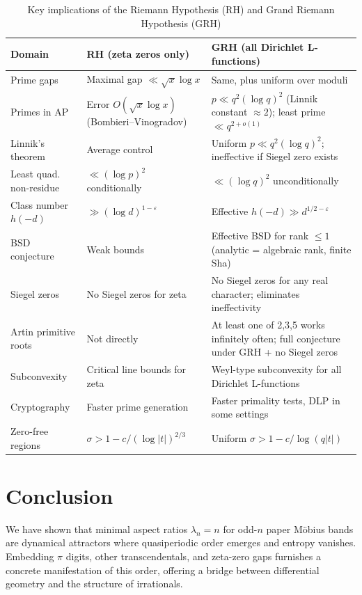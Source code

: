 \documentclass[11pt,a4paper]{article}
\begin{document}
\begin{table}[ht]
\centering
\renewcommand{\arraystretch}{1.3}
\caption{Key implications of the Riemann Hypothesis (RH) and Grand Riemann Hypothesis (GRH)}
\label{tab:rh-grh-implications}
\begin{tabular}{l >{\raggedright\arraybackslash}p{5.8cm} >{\raggedright\arraybackslash}p{5.8cm}}
\toprule
Domain & RH (zeta zeros only) & GRH (all Dirichlet L-functions) \\
\midrule
Prime gaps & Maximal gap $\ll \sqrt{x} \log x$ & Same, plus uniform over moduli \\
\midrule
Primes in AP & Error $O(\sqrt{x} \log x)$ (Bombieri--Vinogradov) & $p \ll q^2 (\log q)^2$ (Linnik constant $\approx 2$); least prime $\ll q^{2+o(1)}$ \\
\midrule
Linnik's theorem & Average control & Uniform $p \ll q^2 (\log q)^2$; ineffective if Siegel zero exists \\
\midrule
Least quad. non-residue & $\ll (\log p)^2$ conditionally & $\ll (\log q)^2$ unconditionally \\
\midrule
Class number $h(-d)$ & $\gg (\log d)^{1-\varepsilon}$ & Effective $h(-d) \gg d^{1/2-\varepsilon}$ \\
\midrule
BSD conjecture & Weak bounds & Effective BSD for rank $\le 1$ (analytic = algebraic rank, finite Sha) \\
\midrule
Siegel zeros & No Siegel zeros for zeta & No Siegel zeros for any real character; eliminates ineffectivity \\
\midrule
Artin primitive roots & Not directly & At least one of 2,3,5 works infinitely often; full conjecture under GRH + no Siegel zeros \\
\midrule
Subconvexity & Critical line bounds for zeta & Weyl-type subconvexity for all Dirichlet L-functions \\
\midrule
Cryptography & Faster prime generation & Faster primality tests, DLP in some settings \\
\midrule
Zero-free regions & $\sigma > 1 - c/(\log |t|)^{2/3}$ & Uniform $\sigma > 1 - c/\log(q|t|)$ \\
\bottomrule
\end{tabular}
\end{table}

\section{Conclusion}
We have shown that minimal aspect ratios $\lambda_n = n$ for odd-$n$ paper M\"obius bands are dynamical attractors where quasiperiodic order emerges and entropy vanishes. Embedding $\pi$ digits, other transcendentals, and zeta-zero gaps furnishes a concrete manifestation of this order, offering a bridge between differential geometry and the structure of irrationals.
\end{document}
